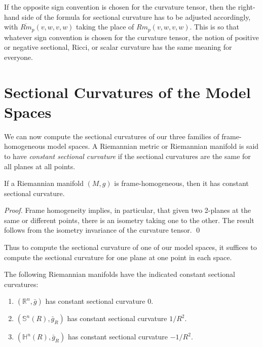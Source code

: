 If the opposite sign convention is chosen for the curvature tensor, then the right-hand side of the formula for sectional curvature has to be adjusted accordingly, with $\overline{Rm}_p(v, w, v, w)$ taking the place of $Rm_p(v, w, v, w)$. This is so that whatever sign convention is chosen for the curvature tensor, the notion of positive or negative sectional, Ricci, or scalar curvature has the same meaning for everyone.

\section{Sectional Curvatures of the Model Spaces}

We can now compute the sectional curvatures of our three families of frame-homogeneous model spaces. A Riemannian metric or Riemannian manifold is said to have \emph{constant sectional curvature} if the sectional curvatures are the same for all planes at all points.

\begin{lemma}
\label{lem:frame-homogeneous-constant-sectional-curvature}
If a Riemannian manifold $(M, g)$ is frame-homogeneous, then it has constant sectional curvature.
\end{lemma}

\begin{proof}
Frame homogeneity implies, in particular, that given two 2-planes at the same or different points, there is an isometry taking one to the other. The result follows from the isometry invariance of the curvature tensor. \qed
\end{proof}

Thus to compute the sectional curvature of one of our model spaces, it suffices to compute the sectional curvature for one plane at one point in each space.

\begin{theorem}
\label{thm:sectional-curvatures-model-spaces}
The following Riemannian manifolds have the indicated constant sectional curvatures:
\begin{enumerate}
\item[(a)] $(\mathbb{R}^n, \bar{g})$ has constant sectional curvature $0$.
\item[(b)] $(\mathbb{S}^n(R), \bar{g}_R)$ has constant sectional curvature $1/R^2$.
\item[(c)] $(\mathbb{H}^n(R), \bar{g}_R)$ has constant sectional curvature $-1/R^2$.
\end{enumerate}
\end{theorem}

